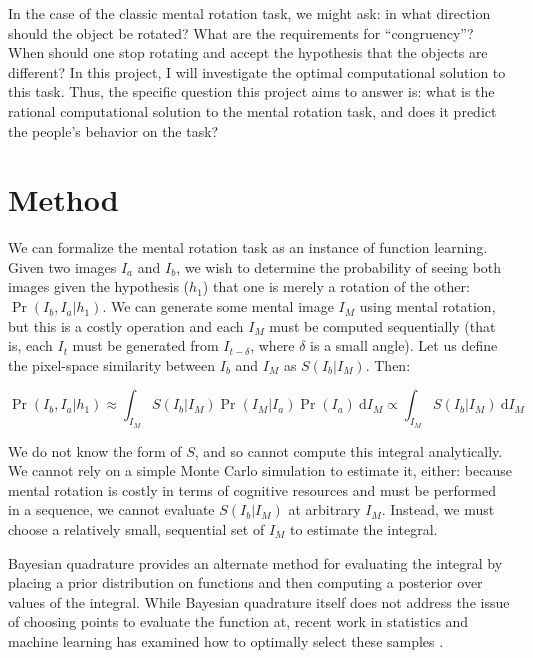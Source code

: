 \documentclass{article} %
\begin{document}
In the case of the classic mental rotation task, we might ask: in what
direction should the object be rotated?  What are the requirements for
``congruency''? When should one stop rotating and accept the
hypothesis that the objects are different? In this project, I will
investigate the optimal computational solution to this task. Thus, the
specific question this project aims to answer is: what is the rational
computational solution to the mental rotation task, and does it
predict the people's behavior on the task?

\section{Method}

We can formalize the mental rotation task as an instance of function
learning. Given two images $I_a$ and $I_b$, we wish to determine the
probability of seeing both images given the hypothesis ($h_1$) that
one is merely a rotation of the other: $\Pr(I_b, I_a|h_1)$. We can
generate some mental image $I_M$ using mental rotation, but this is a
costly operation and each $I_M$ must be computed sequentially (that
is, each $I_t$ must be generated from $I_{t-\delta}$, where $\delta$
is a small angle). Let us define the pixel-space similarity between
$I_b$ and $I_M$ as $S(I_b| I_M)$. Then:

\begin{equation}
\Pr(I_b, I_a | h_1)\approx\int_{I_M}S(I_b| I_M)\Pr(I_M|I_a)\Pr(I_a)\ \mathrm{d}I_M\propto \int_{I_M}S(I_b|I_M)\ \mathrm{d}I_M
\end{equation}

We do not know the form of $S$, and so cannot compute this integral
analytically. We cannot rely on a simple Monte Carlo simulation to
estimate it, either: because mental rotation is costly in terms of
cognitive resources and must be performed in a sequence, we cannot
evaluate $S(I_b|I_M)$ at arbitrary $I_M$. Instead, we must choose a
relatively small, sequential set of $I_M$ to estimate the
integral. 

Bayesian quadrature \cite{Diaconis:1988uo} provides an alternate
method for evaluating the integral by placing a prior distribution on
functions and then computing a posterior over values of the
integral. While Bayesian quadrature itself does not address the issue
of choosing points to evaluate the function at, recent work in
statistics and machine learning has examined how to optimally select
these samples \cite{Osborne:2012tm}.
\end{document}
